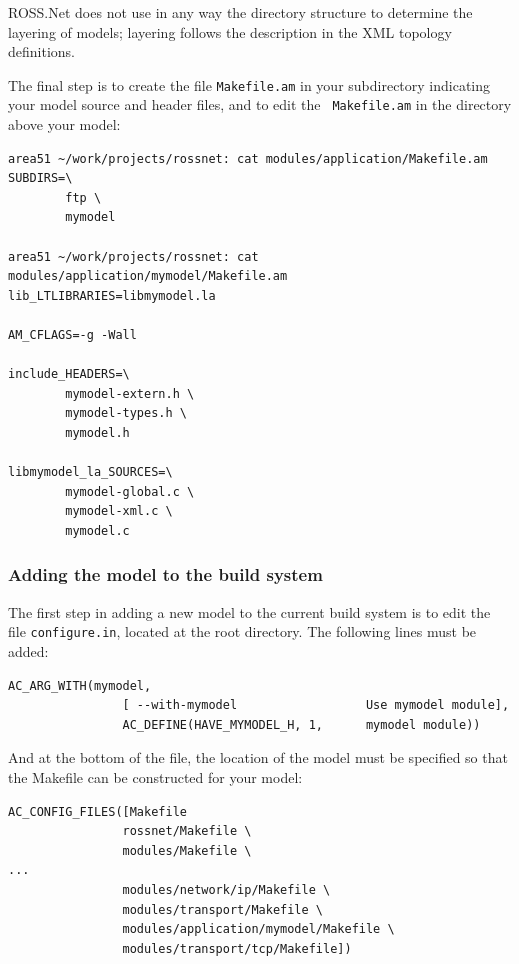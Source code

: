 \documentclass[12pt]{article}
\begin{document}
ROSS.Net does not use in any way the directory structure to determine the
 layering of models; layering follows the description in the XML topology
 definitions.

The final step is to create the file {\tt Makefile.am} in your subdirectory
 indicating your model source and header files, and to edit the {\tt
 Makefile.am} in the directory above your model:

\begin{small}\begin{verbatim}
area51 ~/work/projects/rossnet: cat modules/application/Makefile.am
SUBDIRS=\
        ftp \
        mymodel

area51 ~/work/projects/rossnet: cat modules/application/mymodel/Makefile.am
lib_LTLIBRARIES=libmymodel.la

AM_CFLAGS=-g -Wall

include_HEADERS=\
        mymodel-extern.h \
        mymodel-types.h \
        mymodel.h

libmymodel_la_SOURCES=\
        mymodel-global.c \
        mymodel-xml.c \
        mymodel.c
\end{verbatim}
\end{small}

\subsubsection{Adding the model to the build system}

The first step in adding a new model to the current build system is to edit
the file {\tt configure.in}, located at the root directory.  The following
lines must be added:

\begin{small}
\begin{verbatim}
AC_ARG_WITH(mymodel,
                [ --with-mymodel                  Use mymodel module],
                AC_DEFINE(HAVE_MYMODEL_H, 1,      mymodel module))
\end{verbatim}\end{small}

And at the bottom of the file, the location of the model must be specified so that the Makefile can be constructed for your model:

\begin{small}
\begin{verbatim}
AC_CONFIG_FILES([Makefile
                rossnet/Makefile \
                modules/Makefile \
...
                modules/network/ip/Makefile \
                modules/transport/Makefile \
                modules/application/mymodel/Makefile \
                modules/transport/tcp/Makefile])
\end{verbatim}
\end{small}
\end{document}
